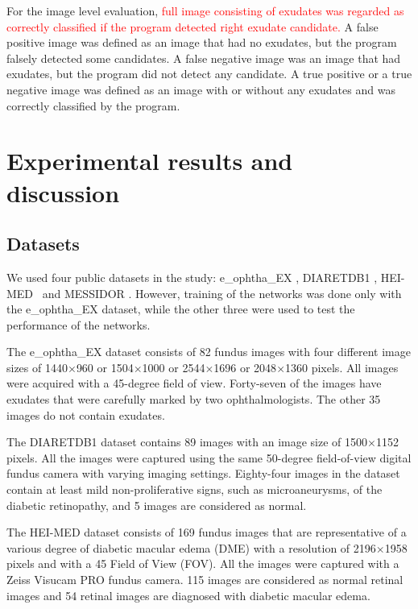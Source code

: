 \documentclass{osa-article}
\begin{document}
For the image level evaluation, \textcolor{red}{full image consisting of exudates was regarded as correctly classified if the program detected right exudate candidate.}  A false positive image was defined as an image that had no exudates, but the program falsely detected some candidates. A false negative image was an image that had exudates, but the program did not detect any candidate. A true positive or a true negative image was defined as an image with or without any exudates and was correctly classified by the program. 


\section{Experimental results and discussion}
\subsection{Datasets} 
We used four public datasets in the study: e\_ophtha\_EX \cite{zhang2014exudate}, DIARETDB1 \cite{kauppi2007diaretdb1}, HEI-MED~\cite{giancardo2012exudate} and MESSIDOR \cite{decenciere2014feedback}. However, training of the networks was done only with the e\_ophtha\_EX dataset, while the other three were used to test the performance of the networks. 


The e\_ophtha\_EX dataset consists of 82 fundus images with four different image sizes of 1440$\times$960 or 1504$\times$1000 or 2544$\times$1696 or 2048$\times$1360 pixels. All images were acquired with a 45-degree field of view. Forty-seven of the images have exudates that were carefully marked by two ophthalmologists. The other
35 images do not contain exudates. 


The DIARETDB1 dataset contains 89 images with an image size of 1500$\times$1152 pixels. All the images were captured using the same 50-degree field-of-view digital fundus camera with varying imaging settings. Eighty-four images in the dataset contain at least mild non-proliferative signs, such as microaneurysms, of the diabetic retinopathy, and 5 images are considered as normal. 

The HEI-MED dataset consists of 169 fundus images that are representative of a various degree of diabetic macular edema (DME) with a resolution of 2196$\times$1958 pixels and with a 45 Field of View (FOV). All the images were captured with a Zeiss Visucam PRO fundus camera. 115 images are considered as normal retinal images and 54 retinal images are diagnosed with diabetic macular edema.
\end{document}

